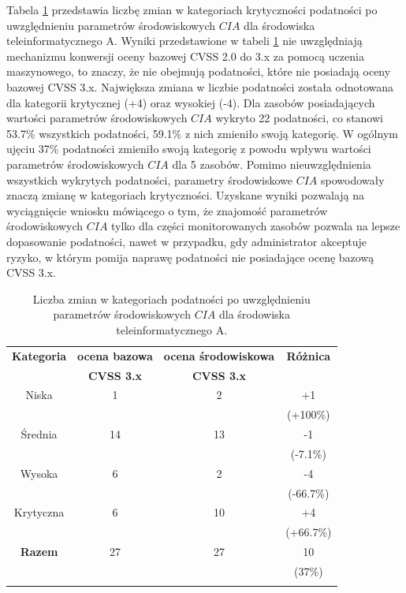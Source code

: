 \bigbreak
Tabela \ref{tab:chapter6:env_a:changes} przedstawia liczbę zmian w kategoriach krytyczności podatności po uwzględnieniu parametrów środowiskowych $CIA$ dla środowiska teleinformatycznego A. Wyniki przedstawione w tabeli \ref{tab:chapter6:env_a:changes} nie uwzględniają mechanizmu konwersji oceny bazowej CVSS 2.0 do 3.x za pomocą uczenia maszynowego, to znaczy, że nie obejmują podatności, które nie posiadają oceny bazowej CVSS 3.x. Największa zmiana w liczbie podatności została odnotowana dla kategorii krytycznej (+4) oraz wysokiej (-4). Dla zasobów posiadających wartości parametrów środowiskowych $CIA$ wykryto 22 podatności, co stanowi 53.7\% wszystkich podatności, 59.1\% z nich zmieniło swoją kategorię. W ogólnym ujęciu 37\% podatności zmieniło swoją kategorię z powodu wpływu wartości parametrów środowiskowych $CIA$ dla 5 zasobów. Pomimo nieuwzględnienia wszystkich wykrytych podatności, parametry środowiskowe $CIA$ spowodowały znaczą zmianę w kategoriach krytyczności. Uzyskane wyniki pozwalają na wyciągnięcie wniosku mówiącego o tym, że znajomość parametrów środowiskowych $CIA$ tylko dla części monitorowanych zasobów pozwala na lepsze dopasowanie podatności, nawet w przypadku, gdy administrator akceptuje ryzyko, w którym pomija naprawę podatności nie posiadające ocenę bazową CVSS 3.x.

\begin{table}[tbh]
\caption{Liczba zmian w kategoriach podatności po uwzględnieniu parametrów środowiskowych $CIA$ dla środowiska teleinformatycznego A.}
\begin{center}
\label{tab:chapter6:env_a:changes}
\begin{tabular}{cccc}
\hline \noalign {\smallskip}
\textbf{Kategoria} & \textbf{ocena bazowa} & \textbf{ocena środowiskowa} & \textbf{Różnica} \\
                      & \textbf{CVSS 3.x} & \textbf{CVSS 3.x} & \\
  \hline
  Niska         &      1 &      2  &  +1          \\
                &        &         &  (+100\%)     \\
  Średnia       &     14 &      13 &  -1           \\
                &        &         &  (-7.1\%)       \\
  Wysoka        &      6 &       2 &  -4           \\
                &        &         &  (-66.7\%)   \\
  Krytyczna     &      6 &      10 &  +4          \\
                &        &         &  (+66.7\%)   \\
\hline \noalign {\smallskip}
\textbf{Razem}  &     27 &      27 & 10 \\
                &        &         & (37\%) \\
\hline \noalign {\smallskip}
\end{tabular}
\end{center}
\end{table}

